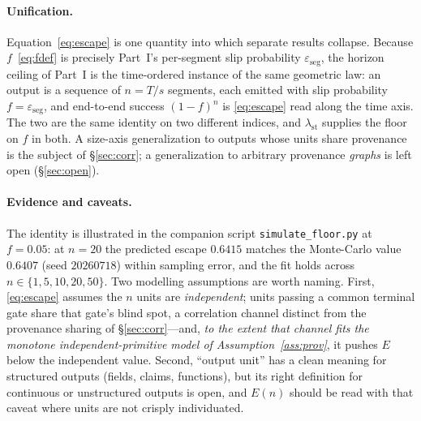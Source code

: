\documentclass[11pt]{article}
\theoremstyle{definition}
\theoremstyle{remark}
\newcommand{\lst}{\lambda_{\mathrm{st}}}
\newcommand{\eseg}{\varepsilon_{\mathrm{seg}}}
\newcommand{\Esc}{E}
\newcommand{\fesc}{f}
\begin{document}
\paragraph{Unification.}
Equation~\eqref{eq:escape} is one quantity into which separate results collapse. Because
$\fesc$~\eqref{eq:fdef} is precisely Part~I's per-segment slip probability $\eseg$, the horizon ceiling
of Part~I is the time-ordered instance of the same geometric law: an output is a sequence of $n=T/s$
segments, each emitted with slip probability $\fesc=\eseg$, and end-to-end success $(1-\fesc)^n$ is
\eqref{eq:escape} read along the time axis. The two are the same identity on two different indices, and
$\lst$ supplies the floor on $\fesc$ in both. A size-axis generalization to outputs whose units share
provenance is the subject of \S\ref{sec:corr}; a generalization to arbitrary provenance \emph{graphs}
is left open (\S\ref{sec:open}).

\paragraph{Evidence and caveats.}
The identity is illustrated in the companion script \texttt{simulate\_floor.py} at $\fesc=0.05$:
at $n=20$ the predicted escape $0.6415$ matches the Monte-Carlo value $0.6407$ (seed $20260718$) within
sampling error, and the fit holds across $n\in\{1,5,10,20,50\}$. Two modelling assumptions are worth
naming. First, \eqref{eq:escape} assumes the $n$ units are \emph{independent}; units passing a common
terminal gate share that gate's blind spot, a correlation channel distinct from the provenance sharing
of \S\ref{sec:corr}---and, \emph{to the extent that channel fits the monotone independent-primitive
model of Assumption~\ref{ass:prov}}, it pushes $\Esc$ below the independent value. Second, ``output
unit'' has a clean meaning for structured
outputs (fields, claims, functions), but its right definition for continuous or unstructured outputs is
open, and $\Esc(n)$ should be read with that caveat where units are not crisply individuated.
\end{document}
